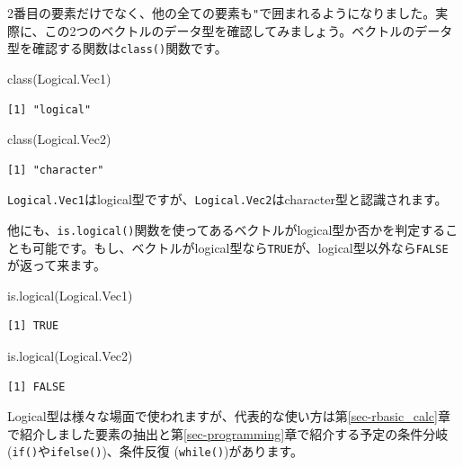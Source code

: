 \documentclass[
  a4paper,
  pandoc,
  ja=standard,
  jafont=haranoaji]{bxjsbook}
\newenvironment{Shaded}{\begin{snugshade}}{\end{snugshade}}
\newcommand{\FunctionTok}[1]{\textcolor[rgb]{0.28,0.35,0.67}{#1}}
\newcommand{\NormalTok}[1]{\textcolor[rgb]{0.00,0.48,0.65}{#1}}
\begin{document}
2番目の要素だけでなく、他の全ての要素も\texttt{"}で囲まれるようになりました。実際に、この2つのベクトルのデータ型を確認してみましょう。ベクトルのデータ型を確認する関数は\texttt{class()}関数です。

\begin{Shaded}
\begin{Highlighting}[numbers=left,,]
\FunctionTok{class}\NormalTok{(Logical.Vec1)}
\end{Highlighting}
\end{Shaded}

\begin{verbatim}
[1] "logical"
\end{verbatim}

\begin{Shaded}
\begin{Highlighting}[numbers=left,,]
\FunctionTok{class}\NormalTok{(Logical.Vec2)}
\end{Highlighting}
\end{Shaded}

\begin{verbatim}
[1] "character"
\end{verbatim}

\texttt{Logical.Vec1}はlogical型ですが、\texttt{Logical.Vec2}はcharacter型と認識されます。

他にも、\texttt{is.logical()}関数を使ってあるベクトルがlogical型か否かを判定することも可能です。もし、ベクトルがlogical型なら\texttt{TRUE}が、logical型以外なら\texttt{FALSE}が返って来ます。

\begin{Shaded}
\begin{Highlighting}[numbers=left,,]
\FunctionTok{is.logical}\NormalTok{(Logical.Vec1)}
\end{Highlighting}
\end{Shaded}

\begin{verbatim}
[1] TRUE
\end{verbatim}

\begin{Shaded}
\begin{Highlighting}[numbers=left,,]
\FunctionTok{is.logical}\NormalTok{(Logical.Vec2)}
\end{Highlighting}
\end{Shaded}

\begin{verbatim}
[1] FALSE
\end{verbatim}

Logical型は様々な場面で使われますが、代表的な使い方は第\ref{sec-rbasic_calc}章で紹介しました要素の抽出と第\ref{sec-programming}章で紹介する予定の条件分岐
(\texttt{if()}や\texttt{ifelse()})、条件反復
(\texttt{while()})があります。
\end{document}
